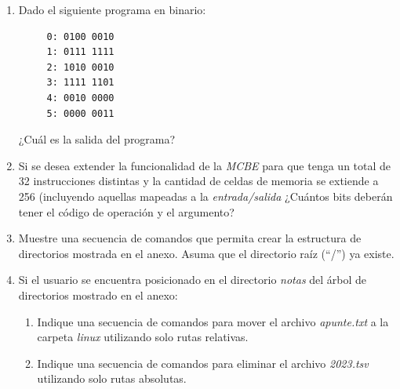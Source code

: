 \documentclass[12pt]{article}
\begin{document}
\begin{enumerate}
        \begin{enumerate}

            \item ¿Cuál es la salida del programa?

            \item ¿Cuál es el equivalente en código maquina binario de las
                instrucciones de las direcciones \textbf{0}, \textbf{1} y
                \textbf{5}?

        \end{enumerate}

    \item Dado el siguiente programa en binario:

        \begin{verbatim}
     0: 0100 0010
     1: 0111 1111
     2: 1010 0010
     3: 1111 1101
     4: 0010 0000
     5: 0000 0011
        \end{verbatim}

        ¿Cuál es la salida del programa?

    \item Si se desea extender la funcionalidad de la \emph{MCBE} para que
        tenga un total de 32 instrucciones distintas y la cantidad de celdas
        de memoria se extiende a 256 (incluyendo aquellas mapeadas a la
        \emph{entrada/salida} ¿Cuántos bits deberán tener el código de
        operación y el argumento?

    \item Muestre una secuencia de comandos que permita crear la estructura de
        directorios mostrada en el anexo. Asuma que el directorio raíz (``/'')
        ya existe.

    \item Si el usuario se encuentra posicionado en el directorio
        \emph{notas} del árbol de directorios mostrado en el anexo:

        \begin{enumerate}

            \item Indique una secuencia de comandos para mover el archivo
                \emph{apunte.txt} a la carpeta \emph{linux} utilizando solo
                rutas relativas.

            \item Indique una secuencia de comandos para eliminar el archivo
                \emph{2023.tsv} utilizando solo rutas absolutas.

        \end{enumerate}

\end{enumerate}
\end{document}
